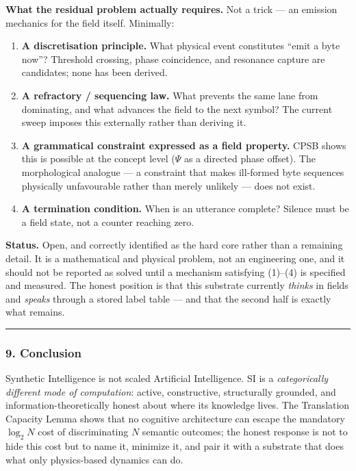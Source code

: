 \documentclass[
  11pt,
  a4paper,
]{article}
\providecommand{\tightlist}{%
  \setlength{\itemsep}{0pt}\setlength{\parskip}{0pt}}
\begin{document}
\textbf{What the residual problem actually requires.} Not a trick --- an
emission mechanics for the field itself. Minimally:

\begin{enumerate}
\def\labelenumi{\arabic{enumi}.}
\tightlist
\item
  \textbf{A discretisation principle.} What physical event constitutes
  ``emit a byte now''? Threshold crossing, phase coincidence, and
  resonance capture are candidates; none has been derived.
\item
  \textbf{A refractory / sequencing law.} What prevents the same lane
  from dominating, and what advances the field to the next symbol? The
  current sweep imposes this externally rather than deriving it.
\item
  \textbf{A grammatical constraint expressed as a field property.} CPSB
  shows this is possible at the concept level (\(\Psi\) as a directed
  phase offset). The morphological analogue --- a constraint that makes
  ill-formed byte sequences physically unfavourable rather than merely
  unlikely --- does not exist.
\item
  \textbf{A termination condition.} When is an utterance complete?
  Silence must be a field state, not a counter reaching zero.
\end{enumerate}

\textbf{Status.} Open, and correctly identified as the hard core rather
than a remaining detail. It is a mathematical and physical problem, not
an engineering one, and it should not be reported as solved until a
mechanism satisfying (1)--(4) is specified and measured. The honest
position is that this substrate currently \emph{thinks} in fields and
\emph{speaks} through a stored label table --- and that the second half
is exactly what remains.

\begin{center}\rule{0.5\linewidth}{0.5pt}\end{center}

\subsubsection{9. Conclusion}\label{conclusion}

Synthetic Intelligence is not scaled Artificial Intelligence. SI is a
\emph{categorically different mode of computation}: active,
constructive, structurally grounded, and information-theoretically
honest about where its knowledge lives. The Translation Capacity Lemma
shows that no cognitive architecture can escape the mandatory
\(\log_2 N\) cost of discriminating \(N\) semantic outcomes; the honest
response is not to hide this cost but to name it, minimize it, and pair
it with a substrate that does what only physics-based dynamics can do.
\end{document}
